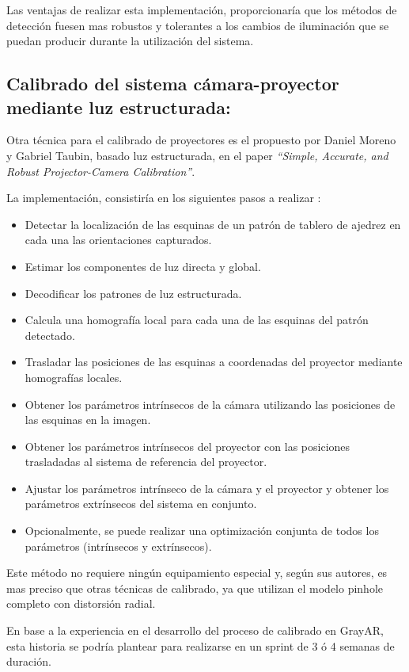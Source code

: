 Las ventajas de realizar esta implementación, proporcionaría que los métodos de detección fuesen mas robustos y tolerantes a los cambios de iluminación que se puedan producir durante la utilización del sistema.    

\subsection{Calibrado del sistema cámara-proyector mediante luz estructurada:} 
Otra técnica para el calibrado de proyectores es el propuesto por Daniel Moreno y Gabriel Taubin, basado luz estructurada, en el paper \textit{``Simple, Accurate, and Robust Projector-Camera Calibration''}. 

La implementación, consistiría en los siguientes pasos a realizar \cite{Moreno}:
\begin{itemize}
\item Detectar la localización de las esquinas de un patrón de tablero de ajedrez en cada una las orientaciones capturados.
\item Estimar los componentes de luz directa y global.
\item Decodificar los patrones de luz estructurada.
\item Calcula una homografía local para cada una de las esquinas del patrón detectado.
\item Trasladar las posiciones de las esquinas a coordenadas del proyector mediante homografías locales.
\item Obtener los parámetros intrínsecos de la cámara utilizando las posiciones de las esquinas en la imagen.
\item Obtener los parámetros intrínsecos del proyector con las posiciones trasladadas al sistema de referencia del proyector.
\item Ajustar los parámetros intrínseco de la cámara y el proyector y obtener los parámetros extrínsecos del sistema en conjunto.
\item Opcionalmente, se puede realizar una optimización conjunta de todos los parámetros (intrínsecos y extrínsecos).
\end{itemize}

Este método no requiere ningún equipamiento especial y, según sus autores, es mas preciso que otras técnicas de calibrado, ya que utilizan el modelo pinhole completo con distorsión radial. 

En base a la experiencia en el desarrollo del proceso de calibrado en GrayAR, esta historia se podría plantear para realizarse en un sprint de 3 ó 4 semanas de duración.  

